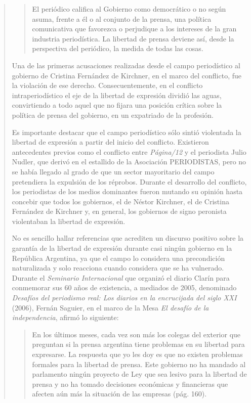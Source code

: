 \begin{quote}
\begin{quote}
	El periódico califica al Gobierno como democrático o no según asuma, frente a él o al conjunto de la prensa, una política comunicativa que favorezca o perjudique a los intereses de la gran industria periodística. La libertad de prensa  deviene así, desde la perspectiva del periódico, la medida de todas las cosas.
\end{quote}


Una de las primeras acusaciones realizadas desde el campo periodístico al gobierno de Cristina Fernández de Kirchner, en el marco del conflicto, fue la violación de ese derecho. Consecuentemente, en el conflicto intraperiodístico el eje de la libertad de expresión dividió las aguas, convirtiendo a todo aquel que no fijara una posición crítica sobre la política de prensa del gobierno, en un expatriado de la profesión.

Es importante destacar que el campo periodístico sólo sintió violentada la libertad de expresión a partir del inicio del conflicto. Existieron antecedentes previos como el conflicto entre \emph{Página/12} y el periodista Julio Nudler, que derivó en el estallido de la Asociación PERIODISTAS, pero no se había llegado al grado de que un sector mayoritario del campo pretendiera la expulsión de los réprobos. Durante el desarrollo del conflicto, los periodistas de los medios dominantes fueron mutando su opinión hasta concebir que todos los gobiernos, el de Néstor Kirchner, el de Cristina Fernández de Kirchner y, en general, los gobiernos de signo peronista violentaban la libertad de expresión.

No es sencillo hallar referencias que acrediten un discurso positivo sobre la garantía de la libertad de expresión durante casi ningún gobierno en la República Argentina, ya que el campo lo considera una precondición naturalizada y solo reacciona cuando considera que se ha vulnerado. Durante el \emph{Seminario Internacional} que organizó el diario Clarín para conmemorar sus 60 años de existencia, a mediados de 2005, denominado \emph{Desafíos del periodismo real: Los diarios en la encrucijada del siglo XXI} (2006), Fernán Saguier, en el marco de la Mesa \emph{El desafío de la independencia}, afirmó lo siguiente:

\begin{quote}
	En los últimos meses, cada vez son más los colegas del exterior que preguntan si la prensa argentina tiene problemas en su libertad para expresarse. La respuesta que yo les doy es que no existen problemas formales para la libertad de prensa. Este gobierno no ha mandado al parlamento ningún proyecto de Ley que sea lesivo para la libertad de prensa y no ha tomado decisiones económicas y financieras que afecten aún más la situación de las empresas (pág. 160).
\end{quote}



\end{quote}
